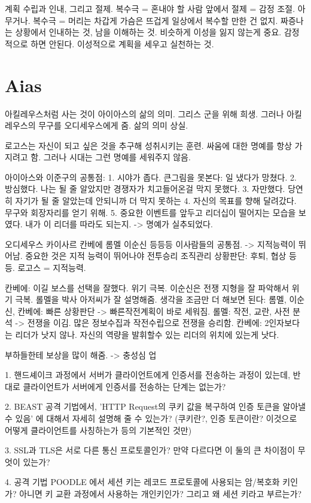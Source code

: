 계획 수립과 인내, 그리고 절제.
복수극 = 혼내야 할 사람 앞에서 절제 = 감정 조절.
아무거나.
복수극 = 머리는 차갑게 가슴은 뜨겁게
일상에서 복수할 만한 건 없지. 짜증나는 상황에서 인내하는 것, 남을 이해하는 것.
비슷하게 이성을 잃지 않는게 중요. 감정적으로 하면 안된다. 이성적으로 계획을 세우고 실천하는 것.

\section{Aias}

아킬레우스처럼 사는 것이 아이아스의 삶의 의미.
그리스 군을 위해 희생.
그러나 아킬레우스의 무구를 오디세우스에게 줌. 삶의 의미 상실.

로고스는 자신이 되고 싶은 것을 추구해 성취시키는 훈련.
싸움에 대한 명예를 항상 가지려고 함. 그러나 시대는 그런 명예를 세워주지 않음.


아이아스와 이준구의 공통점:
1. 시야가 좁다. 큰그림을 못본다: 일 냈다가 망쳤다.
2. 방심했다. 나는 될 줄 알았지만 경쟁자가 치고들어온걸 막지 못했다.
3. 자만했다. 당연히 자기가 될 줄 알았는데 안되니까 더 막지 못하는
4. 자신의 목표를 향해 달려갔다. 무구와 회장자리를 얻기 위해.
5. 중요한 이벤트를 앞두고 리더십이 떨어지는 모습을 보였다. 내가 이 리더를 따라도 되는지. -> 명예가 실추되었다.

오디세우스 카이사르 칸베에 롬멜 이순신 등등등
이사람들의 공통점. -> 지적능력이 뛰어남.
중요한 것은 지적 능력이 뛰어나야 전투승리 조직관리 상황판단: 후퇴, 협상 등등.
로고스 = 지적능력. 

칸베에: 이길 보스를 선택을 잘했다. 위기 극복.
이순신은 전쟁 지형을 잘 파악해서 위기 극복. 롤멜을 박사 아저씨가 잘 설명해줌.
생각을 조금만 더 해보면 된다: 롬멜, 이순신, 칸베에: 빠른 상황판단 -> 빠른작전계획이 바로 세워짐.
롤멜: 작전, 교란, 사전 분석 -> 전쟁을 이김. 많은 정보수집과 작전수립으로 전쟁을 승리함.
칸베에: 2인자보다는 리더가 낫지 않나. 자신의 역량을 발휘할수 있는 리더의 위치에 있는게 낫다.

부하들한테 보상을 많이 해줌. -> 충성심 업


1.  핸드셰이크 과정에서 서버가 클라이언트에게 인증서를 전송하는 과정이 있는데, 
반대로 클라이언트가 서버에게 인증서를 전송하는 단계는 없는가? 

2.  BEAST 공격 기법에서, 'HTTP Request의 쿠키 값을 복구하여 인증 토큰을 알아낼 수 있음'
    에 대해서 자세히 설명해 줄 수 있는가?
    (쿠키란?, 인증 토큰이란? 이것으로 어떻게 클라이언트를 사칭하는가 등의 기본적인 것만)

3.  SSL과 TLS은 서로 다른 통신 프로토콜인가?
    만약 다르다면 이 둘의 큰 차이점이 무엇이 있는가?

4.  공격 기법 POODLE 에서 세션 키는 레코드 프로토콜에 사용되는 암/복호화 키인가?
    아니면 키 교환 과정에서 사용하는 개인키인가?
    그리고 왜 세션 키라고 부르는가?

    